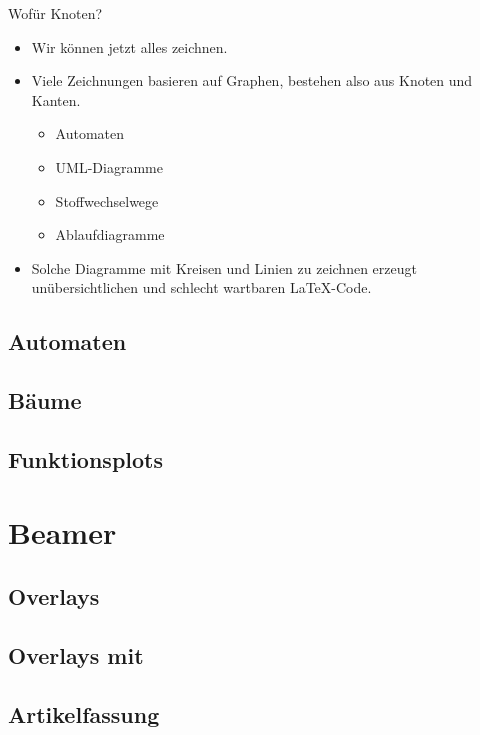 \documentclass[xcolor=table]{beamer}
\begin{document}
\begin{frame}{Wofür Knoten?}
  \begin{itemize}
    \item \alert{Wir können jetzt alles zeichnen.}
    \item Viele Zeichnungen basieren auf Graphen,
      bestehen also aus Knoten und Kanten.
      \begin{itemize}
        \item Automaten
        \item UML-Diagramme
        \item Stoffwechselwege
        \item Ablaufdiagramme
      \end{itemize}
    \item Solche Diagramme mit Kreisen und Linien zu zeichnen erzeugt
      \alert{unübersichtlichen und schlecht wartbaren} \LaTeX-Code.
  \end{itemize}
\end{frame}


\subsection{Automaten}

\subsection{Bäume}

\subsection{Funktionsplots}

\section{Beamer}



\subsection{Overlays}

\subsection{Overlays mit \TikZ}

\subsection{Artikelfassung}


\end{document}
